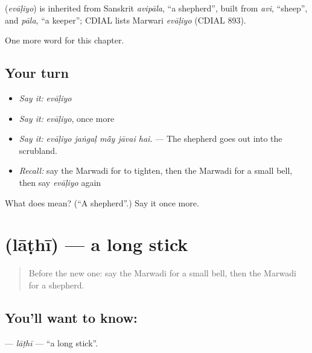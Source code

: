 \begin{cousinweb}
\textbf{} (\emph{evāḷiyo}) is inherited from Sanskrit \emph{avipāla}, \textquotedblleft{}a shepherd\textquotedblright{}, built from \emph{avi}, \textquotedblleft{}sheep\textquotedblright{}, and \emph{pāla}, \textquotedblleft{}a keeper\textquotedblright{}; CDIAL lists Marwari \emph{evāḷiyo} (CDIAL 893).
\end{cousinweb}

\begin{grammarlens}[title={What you've built}]
One more word for this chapter.
\end{grammarlens}

\subsection*{Your turn}
\begin{itemize}
\raggedright
  \item \emph{Say it:} \emph{evāḷiyo}
  \item \emph{Say it:} \emph{evāḷiyo}, once more
  \item \emph{Say it:} \emph{evāḷiyo jaṅgaḷ mā̃y jāvai hai.} — The shepherd goes out into the scrubland.
  \item \emph{Recall:} say the Marwadi for to tighten, then the Marwadi for a small bell, then say \emph{evāḷiyo} again
\end{itemize}

\begin{tcolorbox}[breakable,colback=teal!4,colframe=teal!35!black,title={Before you move on}]
What does  mean? (\textquotedblleft{}A shepherd\textquotedblright{}.) Say it once more.
\end{tcolorbox}
\section[\texorpdfstring{\mw{लाठी} (lāṭhī)}{लाठी (lāṭhī)}]{ (lāṭhī) — a long stick}

\label{lesson:MW-C234-lathi}



\begin{quote}
Before the new one: say the Marwadi for a small bell, then the Marwadi for a shepherd.
\end{quote}

\subsection*{You'll want to know: }
\textbf{} — \emph{lāṭhī} — \textquotedblleft{}a long stick\textquotedblright{}.

